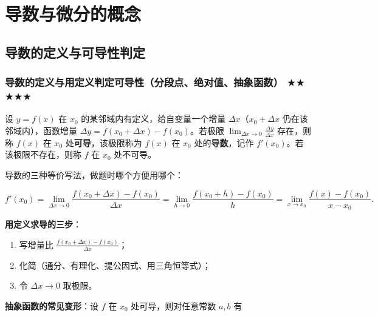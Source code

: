 \documentclass[11pt,openany,UTF8]{ctexbook}
\begin{document}
\endgroup

\section{导数与微分的概念}

\subsection{导数的定义与可导性判定}

\subsubsection{导数的定义与用定义判定可导性（分段点、绝对值、抽象函数） $\bigstar$$\bigstar$$\bigstar$$\bigstar$$\bigstar$}

设 $y=f(x)$ 在 $x_0$ 的某邻域内有定义，给自变量一个增量 $\Delta x$（$x_0+\Delta x$ 仍在该邻域内），函数增量 $\Delta y=f(x_0+\Delta x)-f(x_0)$。若极限 $\lim_{\Delta x\to 0}\frac{\Delta y}{\Delta x}$ 存在，则称 $f(x)$ 在 $x_0$ 处\textbf{可导}，该极限称为 $f(x)$ 在 $x_0$ 处的\textbf{导数}，记作 $f'(x_0)$。若该极限不存在，则称 $f$ 在 $x_0$ 处不可导。

导数的三种等价写法，做题时哪个方便用哪个：

\[f'(x_0)=\lim_{\Delta x\to 0}\frac{f(x_0+\Delta x)-f(x_0)}{\Delta x}
=\lim_{h\to 0}\frac{f(x_0+h)-f(x_0)}{h}
=\lim_{x\to x_0}\frac{f(x)-f(x_0)}{x-x_0}.\]

\textbf{用定义求导的三步}：

\begin{enumerate}
\item 写增量比 $\frac{f(x_0+\Delta x)-f(x_0)}{\Delta x}$；
\item 化简（通分、有理化、提公因式、用三角恒等式）；
\item 令 $\Delta x\to 0$ 取极限。
\end{enumerate}
\textbf{抽象函数的常见变形}：设 $f$ 在 $x_0$ 处可导，则对任意常数 $a,b$ 有
\end{document}
